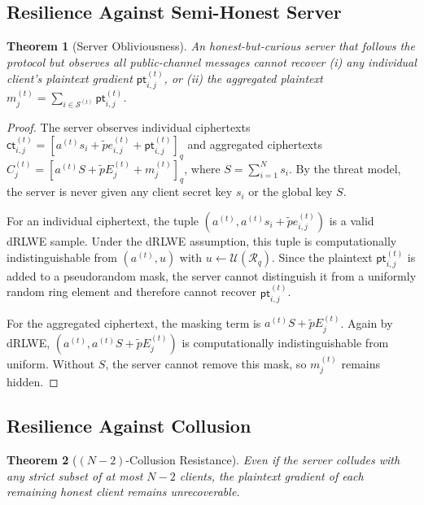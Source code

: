 \documentclass[a4paper,11pt]{article}
\newtheorem{theorem}{Theorem}
\begin{document}
\subsection{Resilience Against Semi-Honest Server}
\label{ssec:server-obliviousness}

\begin{theorem}[Server Obliviousness]
\label{thm:semi-honest-server}
An honest-but-curious server that follows the protocol but observes all public-channel messages cannot recover (i) any individual client's plaintext gradient $\mathsf{pt}_{i,j}^{(t)}$, or (ii) the aggregated plaintext $m_j^{(t)} = \sum_{i \in \mathcal{S}^{(t)}} \mathsf{pt}_{i,j}^{(t)}$.
\end{theorem}

\begin{proof}
The server observes individual ciphertexts $\mathsf{ct}_{i,j}^{(t)} = [a^{(t)} s_i + \tilde{p} e_{i,j}^{(t)} + \mathsf{pt}_{i,j}^{(t)}]_q$ and aggregated ciphertexts $C_j^{(t)} = [a^{(t)} S + \tilde{p} E_j^{(t)} + m_j^{(t)}]_q$, where $S = \sum_{i=1}^N s_i$. By the threat model, the server is never given any client secret key $s_i$ or the global key $S$.

For an individual ciphertext, the tuple $(a^{(t)}, a^{(t)} s_i + \tilde{p} e_{i,j}^{(t)})$ is a valid dRLWE sample. Under the dRLWE assumption, this tuple is computationally indistinguishable from $(a^{(t)}, u)$ with $u \leftarrow \mathcal{U}(\mathcal{R}_q)$. Since the plaintext $\mathsf{pt}_{i,j}^{(t)}$ is added to a pseudorandom mask, the server cannot distinguish it from a uniformly random ring element and therefore cannot recover $\mathsf{pt}_{i,j}^{(t)}$.

For the aggregated ciphertext, the masking term is $a^{(t)} S + \tilde{p} E_j^{(t)}$. Again by dRLWE, $(a^{(t)}, a^{(t)} S + \tilde{p} E_j^{(t)})$ is computationally indistinguishable from uniform. Without $S$, the server cannot remove this mask, so $m_j^{(t)}$ remains hidden.
\end{proof}

\subsection{Resilience Against Collusion}
\label{ssec:collusion}

\begin{theorem}[$(N-2)$-Collusion Resistance]
\label{thm:collusion}
Even if the server colludes with any strict subset of at most $N-2$ clients, the plaintext gradient of each remaining honest client remains unrecoverable.
\end{theorem}
\end{document}
